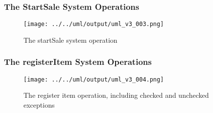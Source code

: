 \documentclass[a4paper]{scrreprt}
\begin{document}
\subsubsection*{The StartSale System Operations}
\begin{figure}[h!]
    \begin{center}
        \texttt{[image: ../../uml/output/uml\_v3\_003.png]}
        \caption{The startSale system operation }
        \label{fig:SD}
    \end{center}
\end{figure}
\subsubsection*{The registerItem System Operations}
\begin{figure}[h!]
    \begin{center}
        \texttt{[image: ../../uml/output/uml\_v3\_004.png]}
        \caption{The register item operation, including checked and unchecked exceptions}
        \label{fig:SD4}
    \end{center}
\end{figure}
\end{document}
